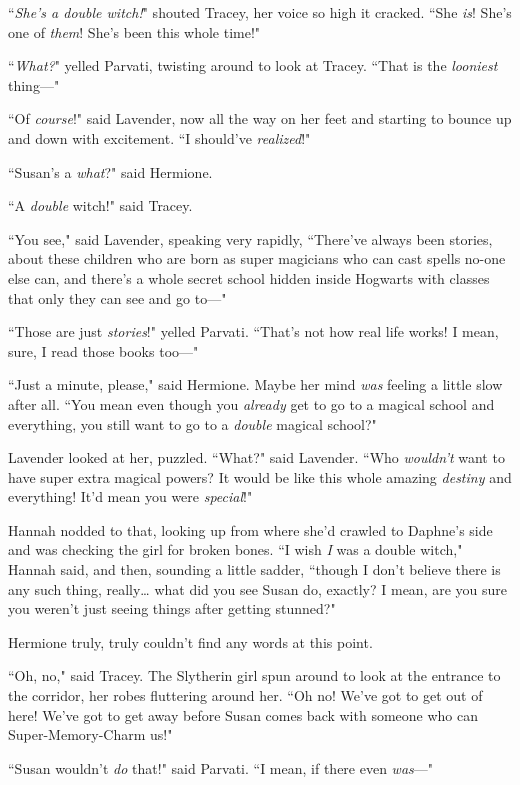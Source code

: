 ``\emph{She's a double witch!}" shouted Tracey, her voice so high it cracked. ``She \emph{is}! She's one of \emph{them}! She's been this whole time!"

``\emph{What?}" yelled Parvati, twisting around to look at Tracey. ``That is the \emph{looniest} thing—"

``Of \emph{course}!" said Lavender, now all the way on her feet and starting to bounce up and down with excitement. ``I should've \emph{realized}!"

``Susan's a \emph{what}?" said Hermione.

``A \emph{double} witch!" said Tracey.

``You see," said Lavender, speaking very rapidly, ``There've always been stories, about these children who are born as super magicians who can cast spells no-one else can, and there's a whole secret school hidden inside Hogwarts with classes that only they can see and go to—"

``Those are just \emph{stories}!" yelled Parvati. ``That's not how real life works! I mean, sure, I read those books too—"

``Just a minute, please," said Hermione. Maybe her mind \emph{was} feeling a little slow after all. ``You mean even though you \emph{already} get to go to a magical school and everything, you still want to go to a \emph{double} magical school?"

Lavender looked at her, puzzled. ``What?" said Lavender. ``Who \emph{wouldn't} want to have super extra magical powers? It would be like this whole amazing \emph{destiny} and everything! It'd mean you were \emph{special}!"

Hannah nodded to that, looking up from where she'd crawled to Daphne's side and was checking the girl for broken bones. ``I wish \emph{I} was a double witch," Hannah said, and then, sounding a little sadder, ``though I don't believe there is any such thing, really{\ldots} what did you see Susan do, exactly? I mean, are you sure you weren't just seeing things after getting stunned?"

Hermione truly, truly couldn't find any words at this point.

``Oh, no," said Tracey. The Slytherin girl spun around to look at the entrance to the corridor, her robes fluttering around her. ``Oh no! We've got to get out of here! We've got to get away before Susan comes back with someone who can Super-Memory-Charm us!"

``Susan wouldn't \emph{do} that!" said Parvati. ``I mean, if there even \emph{was}—"


